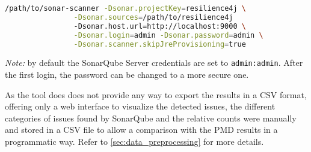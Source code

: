 \begin{lstlisting}[language=bash, caption={Command to run SonarQube analysis on \textit{resilience4j} project codebase}]
              /path/to/sonar-scanner -Dsonar.projectKey=resilience4j \
                -Dsonar.sources=/path/to/resilience4j 
                -Dsonar.host.url=http://localhost:9000 \
                -Dsonar.login=admin -Dsonar.password=admin \
                -Dsonar.scanner.skipJreProvisioning=true
\end{lstlisting}

\noindent \textit{Note:} by default the SonarQube Server credentials are set to \texttt{admin:admin}. After the first login, the password can be changed to a more secure one.

As the tool does does not provide any way to export the results in a CSV format, offering only a web interface to visualize the detected issues, the different categories of issues found by SonarQube and the relative counts were manually and stored in a CSV file to allow a comparison with the PMD results in a programmatic way. Refer to \autoref{sec:data_preprocessing} for more details.
